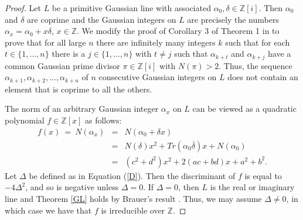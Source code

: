\documentclass[11pt]{article}
\newcommand{\Z}{\mathbb{Z}}
\newcommand{\beq}{\begin{eqnarray*}}
\newcommand{\eeq}{\end{eqnarray*}}
\begin{document}
\begin{proof}  Let $L$ be a primitive Gaussian line with associated $\alpha_0,\delta\in\Z[i]$. Then $\alpha_0$ and $\delta$ are coprime and the Gaussian integers on $L$ are precisely the numbers $\alpha_x=\alpha_0+x\delta$, $x\in\Z$. We modify the proof of Corollary 3 of Theorem 1 in \cite{ford} to prove that for all large 
$n$ there are infinitely many integers $k$ such that for each $t\in\{1,\ldots,n\}$ there is a $j\in\{1,\ldots,n\}$ with $t\neq j$ such that $\alpha_{k+t}$ and $\alpha_{k+j}$
have a common Gaussian prime divisor $\pi\in\Z[i]$ with $N(\pi)>2$.  Thus, the sequence $\alpha_{k+1}, \alpha_{k+2},\ldots, \alpha_{k+n}$ of $n$ consecutive Gaussian integers on $L$ does not contain an element that is coprime to all the others.

The norm of an arbitrary Gaussian integer $\alpha_x$ on $L$ 
 can be viewed as a quadratic polynomial $f\in\Z[x]$ as follows:
\beq\label{N} f(x) \ = \ N(\alpha_x)&=&N(\alpha_0+\delta x)\\
&=&N(\delta)x^2+Tr(\alpha_0\overline\delta)x+N(\alpha_0)\\
&=&(c^2+d^2)x^2+2(ac+bd)x+a^2+b^2\nonumber.
\eeq
Let $\Delta$ be defined as in Equation (\ref{D}). Then the  discriminant  of $f$ is equal to $-4\Delta^2$, and so is negative unless $\Delta=0$.  If  
$\Delta=0$, then $L$ is the real or imaginary line and Theorem \ref{GL} holds by Brauer's result \cite{brauer}.  Thus, we may assume $\Delta\neq 0$, in which case we have that $f$ is irreducible over $\Z$.


\end{proof}
\end{document}

